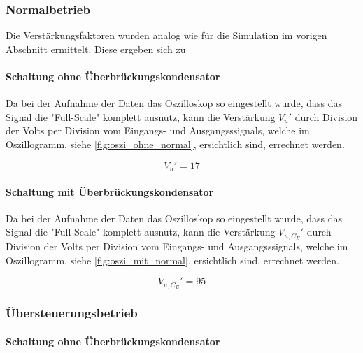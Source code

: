 \documentclass[12pt,english,ngerman]{scrartcl}
\begin{document}
\subsubsection{Normalbetrieb}
Die Verstärkungsfaktoren wurden analog wie für die Simulation im
vorigen Abschnitt  ermittelt. Diese ergeben sich zu

\paragraph{Schaltung ohne Überbrückungskondensator}

Da bei der Aufnahme der Daten das Oszilloskop so eingestellt wurde, dass das
Signal die "Full-Scale" komplett ausnutz, kann die Verstärkung $V_{u}'$ durch
Division der Volts per Division vom Eingangs- und Ausgangsssignals, welche im
Oszillogramm, siehe \autoref{fig:oszi_ohne_normal}, ersichtlich sind, errechnet
werden.

\begin{equation}
  V_{u}' = 17
  \label{eq:oszi_verst_ohne}
\end{equation}

\paragraph{Schaltung mit Überbrückungskondensator}

Da bei der Aufnahme der Daten das Oszilloskop so eingestellt wurde, dass das
Signal die "Full-Scale" komplett ausnutz, kann die Verstärkung $V_{u,C_{E}}'$
durch Division der Volts per Division vom Eingangs- und Ausgangsssignals,
welche im Oszillogramm, siehe \autoref{fig:oszi_mit_normal}, ersichtlich sind,
errechnet werden.

\begin{equation}
  V_{u,C_{E}}' = 95
  \label{eq:oszi_verst_mit}
\end{equation}

\subsubsection{Übersteuerungsbetrieb}
\paragraph{Schaltung ohne Überbrückungskondensator}
\end{document}
